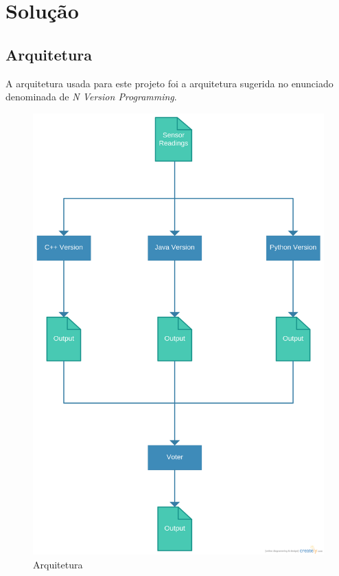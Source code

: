 \chapter{Solução}
\label{cha:solucao}

\section{Arquitetura}
\label{sec:arquitetura}
A arquitetura usada para este projeto foi a arquitetura sugerida no enunciado denominada de \textit{N Version Programming}.

\begin{figure}[htpb]
  \centering
  \includegraphics[scale=0.15]{arquitecture.png}
  \caption{Arquitetura}
  \label{fig:arquitecture}
\end{figure}

